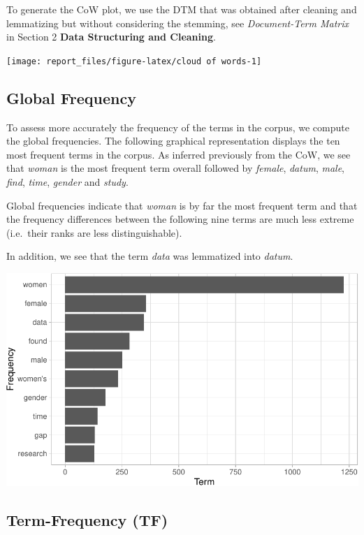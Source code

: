 \documentclass[
]{article}
\begin{document}
To generate the CoW plot, we use the DTM that was obtained after
cleaning and lemmatizing but without considering the stemming, see
\emph{Document-Term Matrix} in Section 2 \textbf{Data Structuring and
Cleaning}.

\begin{center}\texttt{[image: report\_files/figure-latex/cloud of words-1]} \end{center}

\hypertarget{global-frequency}{%
\subsection{Global Frequency}\label{global-frequency}}

To assess more accurately the frequency of the terms in the corpus, we
compute the global frequencies. The following graphical representation
displays the ten most frequent terms in the corpus. As inferred
previously from the CoW, we see that \emph{woman} is the most frequent
term overall followed by \emph{female}, \emph{datum}, \emph{male},
\emph{find}, \emph{time}, \emph{gender} and \emph{study}.

Global frequencies indicate that \emph{woman} is by far the most
frequent term and that the frequency differences between the following
nine terms are much less extreme (i.e.~their ranks are less
distinguishable).

In addition, we see that the term \emph{data} was lemmatized into
\emph{datum}.

\begin{center}\includegraphics[width=0.7\linewidth]{report_files/figure-latex/TF-IDF plot-1} \end{center}

\hypertarget{term-frequency-tf}{%
\subsection{Term-Frequency (TF)}\label{term-frequency-tf}}
\end{document}
